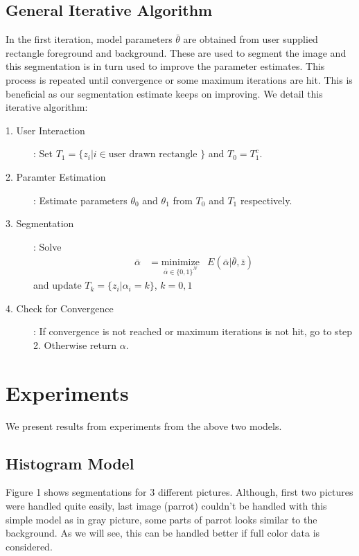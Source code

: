 \documentclass[a4paper]{article}
\begin{document}
\subsection{General Iterative Algorithm}
In the first iteration, model parameters $\bar{\theta}$ are obtained from user supplied rectangle foreground and background. 
These are used to segment the image and this segmentation is in turn used to improve the parameter estimates. This process is repeated until convergence or some maximum iterations are hit.
This is beneficial as our segmentation estimate keeps on improving.
We detail this iterative algorithm:
\begin{description}
\item[1. User Interaction]:
Set $T_1 = \{z_i | i \in \text{user drawn rectangle }\}$ and $T_0 = T_1^c$. 

\item[2. Paramter Estimation]: Estimate parameters $\theta_0$ and $\theta_1$ from $T_0$ and $T_1$ respectively. 

\item[3. Segmentation]: Solve 
\begin{equation*}
\begin{aligned}
\bar{\alpha} &=  
 \underset{\bar{\alpha}\in\{0,1 \}^N}{\text{minimize}}
 & E(\bar{\alpha}| \bar{\theta},\bar{z} )
\end{aligned}
\end{equation*}
and update $T_k = \{z_i | \alpha_i = k\}$, $k = 0,1$

\item[4. Check for Convergence]: If convergence is not reached or maximum iterations is not hit,  
go to step 2. Otherwise return $\alpha$.
\end{description}

\section{Experiments}
We present results from experiments from the above two models.
\subsection{Histogram Model}
Figure 1 shows segmentations for 3 different pictures. 
Although, first two pictures were handled quite easily, last image (parrot) couldn't be handled with this simple model as in gray picture, some parts of parrot looks similar to the background. 
As we will see, this can be handled better if full color data is considered.
\end{document}
